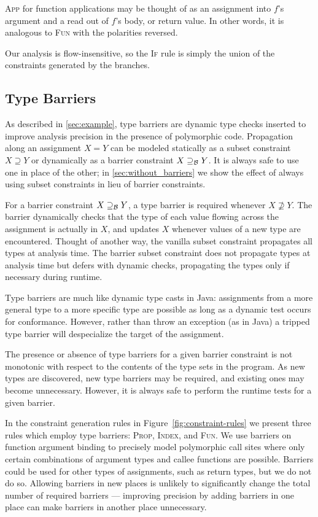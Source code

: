 \textsc{App} for function applications may be thought of as an assignment into
$f$'s argument and a read out of $f$'s body, or return value. In other words,
it is analogous to \textsc{Fun} with the polarities reversed.

Our analysis is flow-insensitive, so the \textsc{If} rule is simply the union
of the constraints generated by the branches.

\subsection{Type Barriers}
\label{sec:analysis-barriers}

As described in \Section\ref{sec:example}, type barriers are dynamic type checks
inserted to improve analysis precision in the presence
of polymorphic code.
Propagation along an assignment $X = Y$ can be modeled
statically as a subset
constraint $X \supseteq Y$ or dynamically as a barrier constraint
$X \supseteq_\mathcal{B} Y$.
It is always safe to use one in place of the other; in \Section\ref{sec:without_barriers}
we show the effect of always using subset constraints in lieu of
barrier constraints.

For a barrier constraint $X \supseteq_\mathcal{B} Y$, a type barrier is required whenever
$X \not\supseteq Y$. The barrier dynamically checks that the type of each value
flowing across the assignment is actually in $X$, and updates $X$ whenever
values of a new type are encountered.
Thought of another way, the vanilla subset constraint propagates
all types at analysis time. The barrier subset constraint does not propagate
types at analysis time but defers with dynamic checks, propagating the types
only if necessary during runtime.

Type barriers are much like dynamic type casts in Java: assignments from a
more general type to a more specific type are possible as long as a
dynamic test occurs for conformance.
However, rather than throw an exception (as in Java) a tripped type barrier will
despecialize the target of the assignment.

The presence or absence of type barriers for a given barrier constraint is not
monotonic with respect to the contents of the type sets in the program.  As
new types are discovered, new type barriers may be required, and existing ones
may become unnecessary.  However, it is always safe to perform the runtime
tests for a given barrier.

In the constraint generation rules in Figure~\ref{fig:constraint-rules} we
present three rules which employ type barriers:
\textsc{Prop}, \textsc{Index}, and \textsc{Fun}. We use barriers on function
argument binding to precisely model polymorphic call sites where
only certain combinations of argument types and callee functions are possible.
Barriers could be used for other types of assignments, such as return types, but we do not do so.
Allowing barriers in new places is unlikely to significantly change the total
number of required barriers --- improving precision by adding barriers in one
place can make barriers in another place unnecessary.

